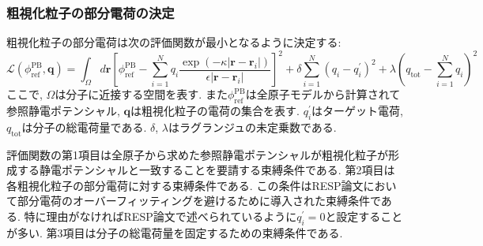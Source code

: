 \subsubsection{粗視化粒子の部分電荷の決定}
粗視化粒子の部分電荷は次の評価関数が最小となるように決定する:
\begin{equation}
    \mathcal{L} (\phi_{\mathrm{ref}}^{\mathrm{PB}}, \bm{q})
    =
    \int_{\Omega} d\bm{r}
    \left[
        \phi_{\mathrm{ref}}^{\mathrm{PB}}
        -
        \sum_{i=1}^{N}
        q_{i}
        \frac{\exp(-\kappa |\bm{r} - \bm{r}_{i}|)}{\epsilon |\bm{r} - \bm{r}_{i}|}
    \right]^{2}
    +
    \delta \sum_{i=1}^{N} (q_{i} - q_{i}^{\prime})^{2}
    +
    \lambda(q_{\mathrm{tot}} - \sum_{i=1}^{N} q_{i})^{2}
    \label{Eq:RESPAC-Evaluation-Function}
\end{equation}
ここで, $\Omega$は分子に近接する空間を表す. また$\phi_{\mathrm{ref}}^{\mathrm{PB}}$は全原子モデルから計算されて参照静電ポテンシャル, $\bm{q}$は粗視化粒子の電荷の集合を表す. $q_{i}^{\prime}$はターゲット電荷, $q_{\mathrm{tot}}$は分子の総電荷量である.
$\delta$, $\lambda$はラグランジュの未定乗数である.

評価関数の第1項目は全原子から求めた参照静電ポテンシャルが粗視化粒子が形成する静電ポテンシャルと一致することを要請する束縛条件である.
第2項目は各粗視化粒子の部分電荷に対する束縛条件である. この条件はRESP論文において部分電荷のオーバーフィッティングを避けるために導入された束縛条件である. 特に理由がなければRESP論文で述べられているように$q_{i}^{\prime} = 0$と設定することが多い.
第3項目は分子の総電荷量を固定するための束縛条件である.

